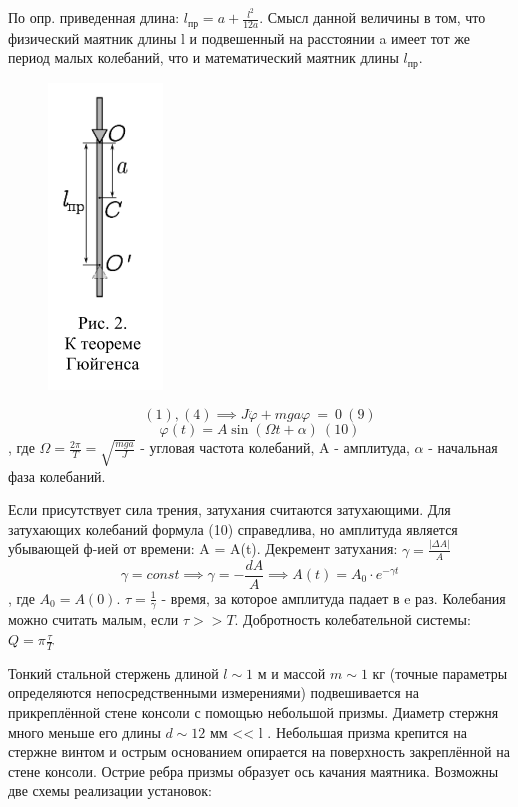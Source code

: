 \documentclass[a4paper,12pt]{article} %
\begin{document}
По опр. приведенная длина: $l_{\text{пр}} = a + \frac{l^2}{12a}$. Смысл данной величины в том, что физический маятник длины l и подвешенный на расстоянии a имеет тот же период малых колебаний, что и математический маятник длины $l_{\text{пр}}$.

\begin{figure} [h]
\center
\includegraphics[scale=0.8]{./141/pic2.png}
\end{figure}

\[(1),(4) \implies J \ddot{\varphi} + mga \varphi \ = \ 0\ (9)\]
\[\varphi(t) = A \sin{(\Omega t + \alpha)}\ (10)\], где $\Omega = \frac{2\pi}{T} = \sqrt{\frac{mga}{J}}$ - угловая частота колебаний, A - амплитуда, $\alpha$ - начальная фаза колебаний.

Если присутствует сила трения, затухания считаются затухающими. Для затухающих колебаний формула (10) справедлива, но амплитуда является убывающей ф-ией от времени: A = A(t).
Декремент затухания: $\gamma = \frac{| \Delta A |}{A}$
\[\gamma = const \implies \gamma = -\frac{dA}{A} \implies A(t) = A_0 \cdot e^{-\gamma t}\], где $A_0 = A(0)$. \newline
$\tau = \frac{1}{\gamma}$ - время, за которое амплитуда падает в e раз.
Колебания можно считать малым, если $\tau >> T$.
Добротность колебательной системы: $Q = \pi \frac{\tau}{T}$

Тонкий стальной стержень длиной $l \sim 1$ м и массой $m \sim 1$ кг (точные параметры определяются непосредственными измерениями) подвешивается на прикреплённой стене консоли с помощью небольшой призмы. Диаметр стержня много меньше его длины $d \sim 12$ мм << l . Небольшая призма
крепится на стержне винтом и острым основанием опирается на поверхность закреплённой на стене консоли. Острие ребра призмы образует ось качания маятника.
Возможны две схемы реализации установок:
\end{document}
